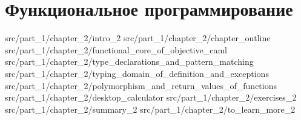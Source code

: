 \chapter{Функциональное программирование}

 {src/part_1/chapter_2/intro_2}
 {src/part_1/chapter_2/chapter_outline}
 {src/part_1/chapter_2/functional_core_of_objective_caml}
 {src/part_1/chapter_2/type_declarations_and_pattern_matching}
 {src/part_1/chapter_2/typing_domain_of_definition_and_exceptions}
 {src/part_1/chapter_2/polymorphism_and_return_values_of_functions}
 {src/part_1/chapter_2/desktop_calculator}
 {src/part_1/chapter_2/exercises_2}
 {src/part_1/chapter_2/summary_2}
 {src/part_1/chapter_2/to_learn_more_2}